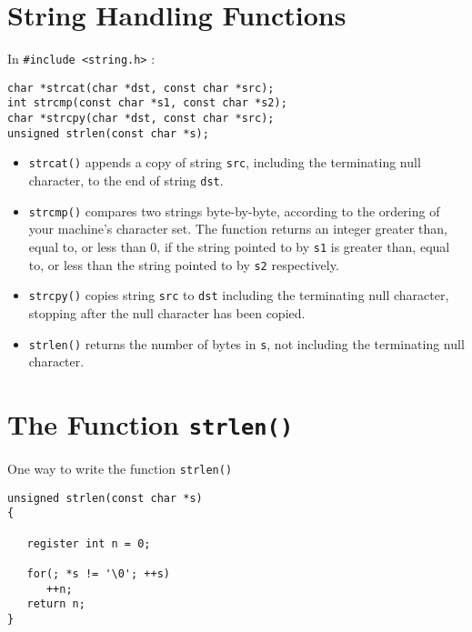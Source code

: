\section*{String Handling Functions}
In \verb^#include <string.h>^ :
{\small
\begin{verbatim}
char *strcat(char *dst, const char *src);
int strcmp(const char *s1, const char *s2);
char *strcpy(char *dst, const char *src);
unsigned strlen(const char *s);
\end{verbatim}
}
\begin{itemize}
\item \verb^strcat()^ appends a copy of string \verb^src^,
including  the  terminating null character,
to  the  end  of  string  \verb^dst^.
\item \verb^strcmp()^ compares two strings byte-by-byte, according to the
     ordering  of  your  machine's  character  set.  The function
     returns an integer greater than, equal to, or less  than  0,
     if the string pointed to by \verb^s1^ is greater than, equal to, or
     less than the string pointed to by \verb^s2^ respectively.
\item \verb^strcpy()^ copies string \verb^src^ to \verb^dst^
including the  terminating null  character,
stopping after the null character has been copied.
\item \verb^strlen()^ returns the number of bytes in \verb^s^,
not including the terminating null character.
\end{itemize}

\newpage
\section*{The Function {\tt strlen()}}
One way to write the function \verb^strlen()^
\begin{verbatim}
unsigned strlen(const char *s)
{

   register int n = 0;

   for(; *s != '\0'; ++s)
      ++n;
   return n;
}
\end{verbatim}

